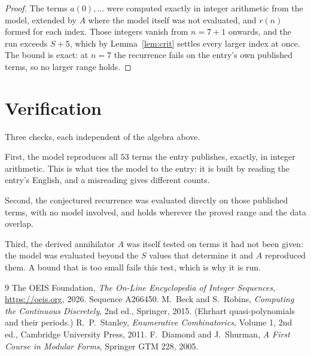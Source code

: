 \documentclass[11pt,a4paper]{article}
\theoremstyle{plain}
\theoremstyle{definition}
\begin{document}
\begin{proof}
The terms $a(0),\dots$ were computed exactly in integer arithmetic from the model, extended by
$A$ where the model itself was not evaluated, and $r(n)$ formed for each index. Those integers
vanish from $n=7+1$ onwards, and the run exceeds $S+5$, which by
Lemma~\ref{lem:crit} settles every larger index at once. The bound is exact: at $n=7$ the recurrence fails on the entry's own published terms, so no larger range holds.
\end{proof}

\section{Verification}

Three checks, each independent of the algebra above.

First, the model reproduces all $53$ terms the entry publishes, exactly, in integer
arithmetic. This is what ties the model to the entry: it is built by reading the entry's
English, and a misreading gives different counts.

Second, the conjectured recurrence was evaluated directly on those published terms, with no
model involved, and holds wherever the proved range and the data overlap.

Third, the derived annihilator $A$ was itself tested on terms it had not been given: the model
was evaluated beyond the $S$ values that determine it and $A$ reproduced them. A bound that is
too small fails this test, which is why it is run.

\begin{thebibliography}{9}
 The OEIS Foundation, \emph{The On-Line Encyclopedia of Integer
Sequences}, \url{https://oeis.org}, 2026. Sequence A266450.
 M.~Beck and S.~Robins, \emph{Computing the Continuous Discretely},
2nd ed., Springer, 2015. (Ehrhart quasi-polynomials and their periods.)
 R.~P.~Stanley, \emph{Enumerative Combinatorics}, Volume 1, 2nd ed.,
Cambridge University Press, 2011.
 F.~Diamond and J.~Shurman, \emph{A First Course in Modular Forms},
Springer GTM 228, 2005.
\end{thebibliography}
\end{document}
